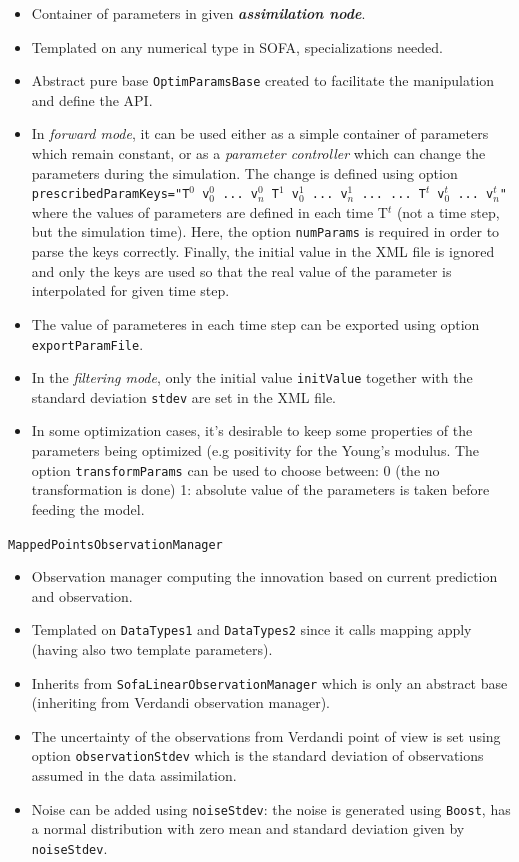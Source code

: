 \documentclass[10pt]{article}
\def\asn{\textit{\textbf{assimilation node}}}
\def\mobs{\texttt{MappedPointsObservationManager}}
\begin{document}
\begin{itemize}
\item Container of parameters in given \asn. 
\item Templated on any numerical type in SOFA, specializations needed.
\item Abstract pure base \texttt{OptimParamsBase} created to facilitate the manipulation and define the API.
\item In \emph{forward mode}, it can be used either as a simple container of parameters which remain constant, or as a \emph{parameter controller} which can change 
the parameters during the simulation. The change is defined using option \texttt{prescribedParamKeys="T$^0$ v$_0^0$ ... v$_n^0$  T$^1$ v$_0^1$ ... v$_n^1$ ... ... T$^t$ v$^t_0$ ... v$^t_n$"} where the 
values of parameters are defined in each time T$^t$ (not a time step, but the simulation time). Here, the option \texttt{numParams} is required in order to parse the keys correctly. 
Finally, the initial value in the XML  file is ignored and only the keys are used so that the 
real value of the parameter is interpolated for given time step.
\item The value of parameteres in each time step can be exported using option \texttt{exportParamFile}.
\item In the \emph{filtering mode}, only the initial value \texttt{initValue} together with the standard deviation \texttt{stdev} are set in the XML file.
\item In some optimization cases, it's desirable to keep some properties of the parameters being optimized (e.g positivity for the Young's modulus. 
The option \texttt{transformParams} can be used to choose between: 0 (the no transformation is done) 1: absolute value of the parameters is taken
before feeding the model.
\end{itemize}
\medskip
{\large\mobs}
\begin{itemize}
\item Observation manager computing the innovation based on current prediction and observation.
\item Templated on \texttt{DataTypes1} and \texttt{DataTypes2} since it calls mapping apply (having also two template parameters).
\item Inherits from \texttt{SofaLinearObservationManager} which is only an abstract base (inheriting from Verdandi observation manager).
\item The uncertainty of the observations from Verdandi point of view is set using option \texttt{observationStdev} which is the standard deviation of
observations assumed in the data assimilation. 
\item Noise can be added using \texttt{noiseStdev}: the noise is generated using \texttt{Boost}, has a normal distribution with zero mean and standard
deviation given by \texttt{noiseStdev}. 
\end{itemize}
\end{document}
